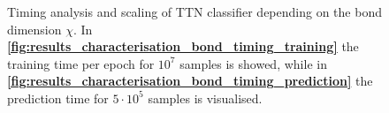 \documentclass[xcolor=table,8pt]{beamer}
\begin{document}
\begin{frame}[t]
        \begin{figure}[!h]
           \begin{minipage}[c]{0.50\textwidth}
                \vspace{0pt}
                \centering
            \end{minipage}%
            \begin{minipage}[c]{0.50\textwidth}
                \vspace{0pt}
                \centering
            \end{minipage}%
            \caption{Timing analysis and scaling of TTN classifier depending on the bond dimension \( \chi \). In \textbf{\ref{fig:results_characterisation_bond_timing_training}} the training time per epoch for \( 10^{7} \) samples is showed, while in \textbf{\ref{fig:results_characterisation_bond_timing_prediction}} the prediction time for \( 5\cdot 10^{5} \) samples is visualised.}
            \label{fig:results_characterisation_bond_timing}
        \end{figure}
    \end{frame}
\end{document}
